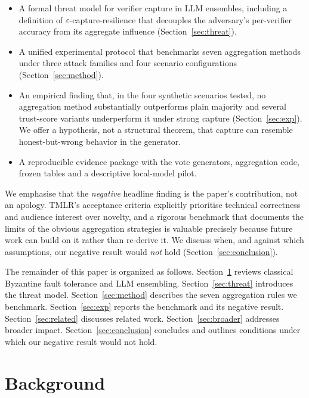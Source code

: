 \documentclass[11pt]{article}
\begin{document}
\begin{itemize}
  \item A formal threat model for verifier capture in LLM ensembles, including
        a definition of $\varepsilon$-capture-resilience that decouples the
        adversary's per-verifier accuracy from its aggregate influence
        (Section~\ref{sec:threat}).
  \item A unified experimental protocol that benchmarks seven aggregation
        methods under three attack families and four scenario configurations
        (Section~\ref{sec:method}).
  \item An empirical finding that, in the four synthetic scenarios tested,
        no aggregation method substantially outperforms plain majority and
        several trust-score variants underperform it under strong capture
        (Section~\ref{sec:exp}). We offer a hypothesis, not a structural
        theorem, that capture can resemble honest-but-wrong behavior in the
        generator.
  \item A reproducible evidence package with the vote generators,
        aggregation code, frozen tables and a descriptive local-model pilot.
\end{itemize}

We emphasise that the \emph{negative} headline finding is the paper's
contribution, not an apology. TMLR's acceptance criteria explicitly
prioritise technical correctness and audience interest over novelty, and a
rigorous benchmark that documents the limits of the obvious aggregation
strategies is valuable precisely because future work can build on it
rather than re-derive it. We discuss when, and against which assumptions,
our negative result would \emph{not} hold
(Section~\ref{sec:conclusion}).

The remainder of this paper is organized as follows.
Section~\ref{sec:background} reviews classical Byzantine fault tolerance and
LLM ensembling. Section~\ref{sec:threat} introduces the threat model.
Section~\ref{sec:method} describes the seven aggregation rules we benchmark.
Section~\ref{sec:exp} reports the benchmark and its negative result.
Section~\ref{sec:related} discusses related work.
Section~\ref{sec:broader} addresses broader impact.
Section~\ref{sec:conclusion} concludes and outlines conditions under which
our negative result would not hold.

\section{Background}
\label{sec:background}
\end{document}
